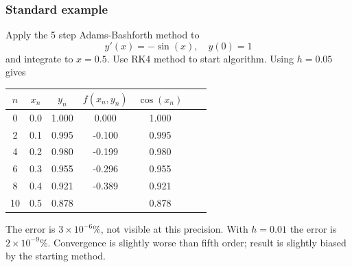 \documentclass{beamer}
\begin{document}
\begin{frame}
  \frametitle{Standard example}

 Apply the 5 step Adams-Bashforth method to
  \begin{equation*}
    y'(x) = - \sin(x), \quad y(0) = 1
  \end{equation*}
  and integrate to $x = 0.5$. Use RK4 method to start algorithm. Using
  $h = 0.05$ gives
  \begin{center}
    \begin{tabular}{c|c c c c c c}
      $n$ & $x_n$ & $y_n$ & $f(x_n, y_n)$ & $\cos(x_n)$ \\
      \hline
      0 & 0.0 & 1.000 &  0.000 & 1.000 \\
      2 & 0.1 & 0.995 & -0.100 & 0.995 \\
      4 & 0.2 & 0.980 & -0.199 & 0.980 \\
      6 & 0.3 & 0.955 & -0.296 & 0.955 \\
      8 & 0.4 & 0.921 & -0.389 & 0.921 \\
      10 & 0.5 & 0.878 &        & 0.878
    \end{tabular}
  \end{center} \pause
  The error is $3 \times 10^{-6}\%$, not visible at this
  precision. With $h = 0.01$ the error is $2 \times 10^{-9}\%$.
  Convergence is slightly worse than fifth order; result is slightly
  biased by the starting method.

\end{frame}
\end{document}
